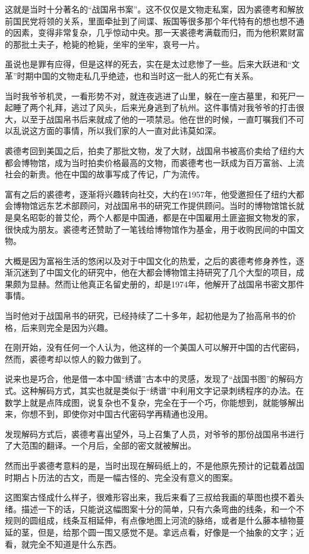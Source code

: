 这就是当时十分著名的“战国帛书案”。这不仅仅是文物走私案，因为裘德考和解放前国民党将领的关系，里面牵扯到了间谍、叛国等很多那个年代特有的想也想不通的因素，变得非常复杂，几乎惊动中央。那一天裘德考满载而归，而为他积累财富的那批土夫子，枪毙的枪毙，坐牢的坐牢，哀号一片。

虽说也是罪有应得，但是这样的死去，实在是太过悲惨了一些。后来大跃进和“文革”时期中国的文物走私几乎绝迹，也和当时这一批人的死亡有关系。

当时我爷爷机灵，一看形势不对，就连夜逃进了山里，躲在一座古墓里，和死尸一起睡了两个礼拜，逃过了风头，后来光身逃到了杭州。这件事情对我爷爷的打击很大，以至于战国帛书后来就成了他的一项禁忌。他在世的时候，一直叮嘱我们不可以乱说这方面的事情，所以我们家的人一直对此讳莫如深。

裘德考回到美国之后，拍卖了那批文物，发了大财，战国帛书被高价卖给了纽约大都会博物馆，成为当时拍卖价格最高的文物，而裘德考也一跃成为百万富翁、上流社会的新贵。他在中国的故事写成了传记，广为流传。

富有之后的裘德考，逐渐将兴趣转向社交，大约在1957年，他受邀担任了纽约大都会博物馆远东艺术部顾问，对战国帛书的研究工作提供顾问。当时的博物馆馆长就是臭名昭彰的普艾伦，两个人都是中国通，都是在中国雇用土匪盗掘文物发的家，很快成为朋友。裘德考还赞助了一笔钱给博物馆作为基金，用于收购民间的中国文物。

大概是因为富裕生活的悠闲以及对于中国文化的热爱，之后的裘德考修身养性，逐渐沉迷到了中国文化的研究中，他在大都会博物馆主持研究了几个大型的项目，成果颇为显赫。然而让他真正名留史册的，却是1974年，他解开了战国帛书密文那件事情。

当时他对于战国帛书的研究，已经持续了二十多年，起初他是为了抬高帛书的价格，后来则完全是因为兴趣。

在刚开始，没有任何一个人认为，他这样的一个美国人可以解开中国的古代密码，然而，裘德考却以惊人的毅力做到了。

说来也是巧合，他是借一本中国“绣谱”古本中的灵感，发现了“战国书图”的解码方式。这种解码方式，其实也就是类似于“绣谱”中利用文字记录刺绣程序的办法。在数学上就是点阵成图，说复杂也不复杂，完全在于一个巧，你能想到，就能够解出来，你想不到，即使你对中国古代密码学再精通也没用。

发现解码方式后，裘德考喜出望外，马上召集了人员，对爷爷的那份战国帛书进行了大范围的翻译。一个月后，全部的密文就被解出。

然而出乎裘德考意料的是，当时出现在解码纸上的，不是他原先预计的记载着战国时期占卜历法的古文，而是一幅古怪的、完全没有意义的图案。

这图案古怪成什么样子，很难形容出来，我后来看了三叔给我画的草图也摸不着头绪。描述一下的话，只能说这幅图案十分的简单，只有六条弯曲的线条，和一个不规则的圆组成，线条互相延伸，有点像地图上河流的脉络，或者是什么藤本植物蔓延的茎，但是，给那个圆一围又感觉不是。拿远点看，好像是一个抽象的文字；近看，就完全不知道是什么东西。

